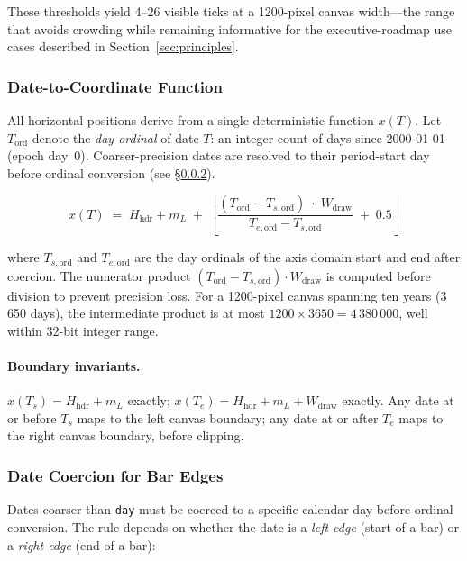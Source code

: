 These thresholds yield 4--26 visible ticks at a 1200-pixel canvas width---the range that
avoids crowding while remaining informative for the executive-roadmap use cases described
in Section~\ref{sec:principles}.

\subsubsection{Date-to-Coordinate Function}
\label{sec:date-to-x}

All horizontal positions derive from a single deterministic function $x(T)$. Let
$T_{\mathrm{ord}}$ denote the \emph{day ordinal} of date $T$: an integer count of days
since 2000-01-01 (epoch day~0). Coarser-precision dates are resolved to their period-start
day before ordinal conversion (see \S\ref{sec:date-coercion}).

\[
  x(T) \;=\; H_{\mathrm{hdr}} + m_L \;+\;
  \left\lfloor
    \dfrac{
      (T_{\mathrm{ord}} - T_{s,\mathrm{ord}}) \;\cdot\; W_{\mathrm{draw}}
    }{
      T_{e,\mathrm{ord}} - T_{s,\mathrm{ord}}
    }
    \;+\; 0.5
  \right\rfloor
\]

where $T_{s,\mathrm{ord}}$ and $T_{e,\mathrm{ord}}$ are the day ordinals of the axis domain
start and end after coercion. The numerator product
$(T_{\mathrm{ord}} - T_{s,\mathrm{ord}}) \cdot W_{\mathrm{draw}}$ is computed before division
to prevent precision loss. For a 1200-pixel canvas spanning ten years (3\,650 days), the
intermediate product is at most $1200 \times 3650 = 4\,380\,000$, well within 32-bit
integer range.

\paragraph{Boundary invariants.}
$x(T_s) = H_{\mathrm{hdr}} + m_L$ exactly;
$x(T_e) = H_{\mathrm{hdr}} + m_L + W_{\mathrm{draw}}$ exactly. Any date at or before $T_s$
maps to the left canvas boundary; any date at or after $T_e$ maps to the right canvas
boundary, before clipping.

\subsubsection{Date Coercion for Bar Edges}
\label{sec:date-coercion}

Dates coarser than \texttt{day} must be coerced to a specific calendar day before ordinal
conversion. The rule depends on whether the date is a \emph{left edge} (start of a bar) or
a \emph{right edge} (end of a bar):

